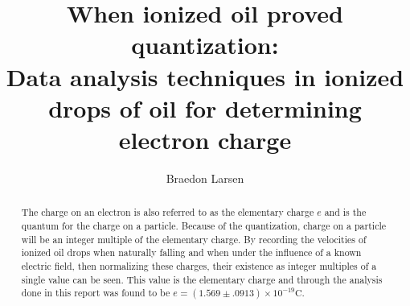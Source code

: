 \documentclass[rc]{physicsinprogress}
\begin{document}
\title{When ionized oil proved quantization:\\ Data analysis techniques in ionized drops of oil for determining electron charge  }
\author{Braedon Larsen}
%


\begin{abstract}
The charge on an electron is also referred to as the elementary charge $e$ and is the quantum for the charge on a particle. Because of the quantization, charge on a particle will be an integer multiple of the elementary charge. By recording the velocities of ionized oil drops when naturally falling and when under the influence of a known electric field, then normalizing these charges, their existence as integer multiples of a single value can be seen. This value is the elementary charge and through the analysis done in this report was found to be $e = (1.569 \pm .0913) \times 10^{-19} \text{C}$.
\end{abstract}

\maketitle
\end{document}
